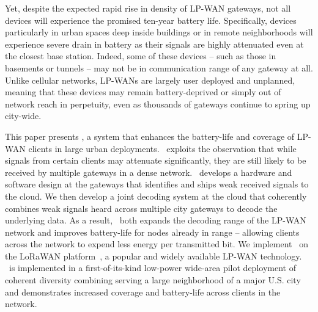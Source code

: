 
Yet, despite the expected rapid rise in density of LP-WAN gateways, not all devices will experience the promised ten-year battery life. Specifically, devices particularly in urban spaces deep inside buildings or in remote neighborhoods will experience severe drain in battery as their signals are highly attenuated even at the closest base station. Indeed, some of these devices -- such as those in basements or tunnels -- may not be in communication range of any gateway at all. Unlike cellular networks, LP-WANs are largely user deployed and unplanned, meaning that these devices may remain battery-deprived or simply out of network reach in perpetuity, even as thousands of gateways continue to spring up city-wide.  



This paper presents \name, a system that enhances the battery-life and
coverage of LP-WAN clients in large urban deployments. \name\ exploits the
observation that while signals from certain clients may attenuate significantly, they are still likely to be received by multiple gateways in a dense network. \name\ develops a hardware and software design at the gateways that identifies and ships weak received signals to the cloud. We then develop a joint decoding system at the cloud that coherently
combines weak signals heard across multiple city gateways to decode the underlying data. As a result, \name\ both expands the decoding range of the LP-WAN network and improves battery-life for nodes already in range -- allowing clients across the network to expend less energy per transmitted bit. We implement \name\ on the LoRaWAN platform~\cite{LoRaWanAlliance2015}, a popular and widely available LP-WAN technology. \name\ is
implemented in a first-of-its-kind low-power wide-area pilot deployment of
coherent diversity combining serving a large neighborhood of a major U.S. city and
demonstrates increased coverage and battery-life across clients in the network.



